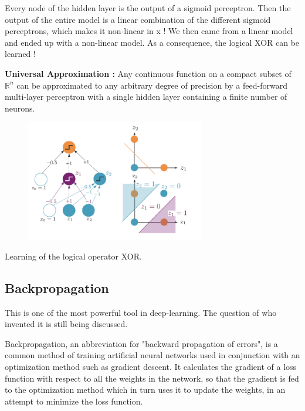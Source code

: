 \documentclass[a4paper,12pt]{article}
\begin{document}
\indent
Every node of the hidden layer is the output of a sigmoid perceptron. Then the output of the entire model is a linear combination of the different sigmoid perceptrons, which makes it non-linear in x ! We then came from a linear model and ended up with a non-linear model. As a consequence, the logical XOR can be learned !

{\bfseries Universal Approximation :} Any continuous function on a compact subset of $\mathbb{R}^n$ can be approximated to any arbitrary degree of precision by a feed-forward multi-layer perceptron with a single hidden layer containing a finite number of neurons.

\newpage

\begin{figure}[!ht]
\centerline{\includegraphics[width=0.7\textwidth]{./figures/XOR_learn.png}}
\end{figure}
\centerline{\footnotesize{Learning of the logical operator XOR.}}

\vspace{0.1in}

\subsection{Backpropagation}

\indent
This is one of the most powerful tool in deep-learning. The question of who invented it is still being discussed. 

\vspace{0.1in}

\indent
Backpropagation, an abbreviation for "backward propagation of errors", is a common method of training artificial neural networks used in conjunction with an optimization method such as gradient descent. It calculates the gradient of a loss function with respect to all the weights in the network, so that the gradient is fed to the optimization method which in turn uses it to update the weights, in an attempt to minimize the loss function.
\end{document}
